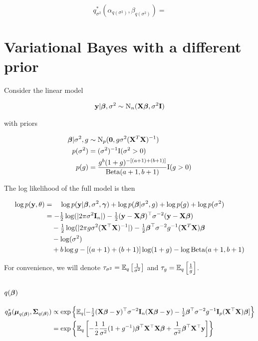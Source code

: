 \documentclass{amsart}[12pt]
\begin{document}
\begin{equation*}
q^*_{\sigma^2}(\alpha_{q(\sigma^2)}, \beta_{q(\sigma^2)}) = 
\end{equation*}

\section{Variational Bayes with a different prior}

Consider the linear model

\begin{align*}
{\bf y} | {\boldsymbol \beta}, \sigma^2 \sim \text{N}_n({\bf X} {\boldsymbol \beta}, \sigma^2 {\bf I})
\end{align*}

with priors

\begin{align*}
{\boldsymbol\beta} | \sigma^2, g &\sim \text{N}_p({\bf 0}, g \sigma^2 ({\bf X}^T {\bf X})^{-1}) \\
p(\sigma^2) &= (\sigma^2)^{-1} \text{I}(\sigma^2 > 0) \\
p(g) &= \frac{g^b (1 + g)^{-[(a + 1) + (b + 1)]}}{\text{Beta}(a + 1, b + 1)} \text{I}(g > 0)
\end{align*}

The log likelihood of the full model is then

\begin{align*}
\log p({\bf y}, \theta) &= \quad\log p({\bf y}|{\boldsymbol \beta}, \sigma^2, {\boldsymbol \gamma}) + \log p({\boldsymbol \beta} | \sigma^2, g) +  \log p(g) + \log p(\sigma^2)\\
&= -\tfrac{1}{2} \log(|2 \pi \sigma^2 {\bf I}_n|) - \tfrac{1}{2} ({\bf y} - {\bf X} {\boldsymbol \beta})^\top \sigma^{-2} ({\bf y} - {\bf X} {\boldsymbol \beta}) \\
&\quad -\tfrac{1}{2} \log(|2 \pi g \sigma^2 ({\bf X}^\top {\bf X})^{-1}|) -\tfrac{1}{2} {\boldsymbol \beta}^\top \sigma^{-2} g^{-1} ({\bf X}^T {\bf X}) {\boldsymbol \beta} \\
&\quad - \log (\sigma^2) \\
&\quad + b \log g - [(a + 1) + (b + 1)] \log (1 + g) - \log \text{Beta}(a + 1, b + 1)
\end{align*}

For convenience, we will denote $\tau_{\sigma^2} = \mathbb{E}_q \left[ \frac{1}{\sigma^2} \right]$ and $\tau_{g} =
\mathbb{E}_q \left[ \frac{1}{g} \right]$.


\subsection{$q({\boldsymbol \beta})$}

\begin{align*}
q_{\boldsymbol \beta}^*({\boldsymbol \mu}_{q({\boldsymbol \beta})}, {\boldsymbol \Sigma}_{q({\boldsymbol \beta})}) &\propto \exp \left \{ \mathbb{E}_q[-\tfrac{1}{2} ({\bf X} {\boldsymbol \beta} - {\bf y})^\top \sigma^{-2} {\bf I}_n ({\bf X} {\boldsymbol \beta} - {\bf y}) - \tfrac{1}{2} {\boldsymbol \beta}^\top \sigma^{-2} g^{-1} {\bf I}_p ({\bf X}^\top {\bf X}) {\boldsymbol \beta}] \right \}\\
&= \exp \left \{ \mathbb{E}_q \left[-\frac{1}{2} \frac{1}{\sigma^2} (1 + g^{-1}){\boldsymbol \beta}^\top {\bf X}^\top {\bf X} {\boldsymbol\beta} + \frac{1}{\sigma^2}{\boldsymbol \beta}^\top {\bf X}^\top {\bf y} \right] \right \}
\end{align*}
\end{document}
